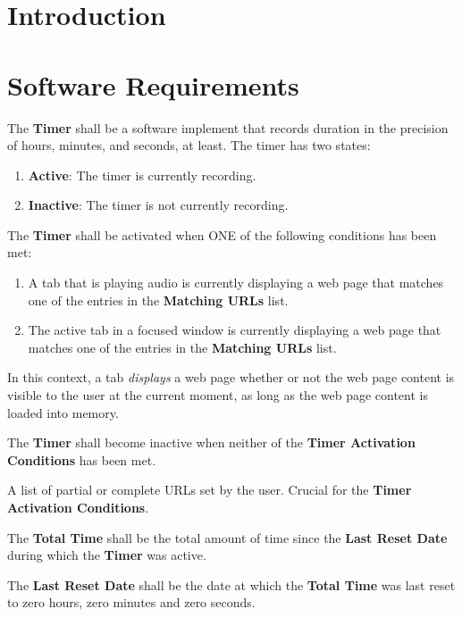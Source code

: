 \documentclass{designdoc}
\begin{document}
\section{Introduction}

\section{Software Requirements}
The \textbf{Timer} shall be a software implement that records duration in the
precision of hours, minutes, and seconds, at least. The timer has two states:
\begin{enumerate}
\item \textbf{Active}: The timer is currently recording.
\item \textbf{Inactive}: The timer is not currently recording.
\end{enumerate}

The \textbf{Timer} shall be activated when ONE of the following conditions has
been met:
\begin{enumerate}
\item A tab that is playing audio is currently displaying a web page that
  matches one of the entries in the \textbf{Matching URLs} list.
\item The active tab in a focused window is currently displaying a web page
  that matches one of the entries in the \textbf{Matching URLs} list.
\end{enumerate}
In this context, a tab \textit{displays} a web page whether or not the web page
content is visible to the user at the current moment, as long as the web page
content is loaded into memory.

The \textbf{Timer} shall become inactive when neither of the \textbf{Timer
  Activation Conditions} has been met.

A list of partial or complete URLs set by the user. Crucial for the
\textbf{Timer Activation Conditions}.

The \textbf{Total Time} shall be the total amount of time since the
\textbf{Last Reset Date} during which the \textbf{Timer} was active.

The \textbf{Last Reset Date} shall be the date at which the \textbf{Total Time}
was last reset to zero hours, zero minutes and zero seconds.
\end{document}
